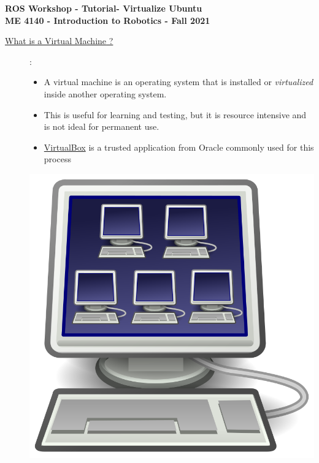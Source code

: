 \documentclass[12pt]{article}
\newcommand{\MNUM}{1} %
\newcommand{\MNAME}{Virtualize Ubuntu} %
\begin{document}
\thispagestyle{plain}

\begin{center}
   {\bf \Large ROS Workshop - Tutorial\hspc\MNUM\hspc - \MNAME}\vspace{3mm}\\
   {\bf \large ME 4140 - Introduction to Robotics - Fall 2021} \vspace{5mm}\\
\end{center}

\begin{description}

 	\item[\underline{What is a \href{https://en.wikipedia.org/wiki/Virtual_machine}{Virtual Machine} ?}]: \\
 	\begin{multicols}{2}
      		
            \begin{itemize}
                
                \item A virtual machine is an operating system that is installed or {\it virtualized} inside another operating system.
                \item This is useful for learning and testing, but it is resource intensive and is not ideal for permanent use. 
                \item \href{https://www.virtualbox.org/}{VirtualBox} is a trusted application from Oracle commonly used for this process
                
            \end{itemize}
            \includegraphics[scale=.15]{CaptureA.png}\\
	\end{multicols}
	

\end{description}
\end{document}
